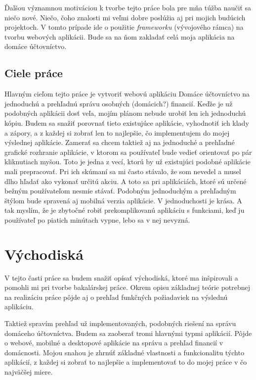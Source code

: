 \documentclass[12pt,oneside]{book}
\begin{document}
Ďalšou významnou motiváciou k tvorbe tejto práce bola pre mňa túžba naučiť sa niečo nové. Niečo, čoho znalosti mi veľmi dobre poslúžia aj pri mojich budúcich projektoch. V tomto prípade ide o použitie \emph{frameworku} (vývojového rámca) na tvorbu webových aplikácii. Bude sa na ňom zakladať celá moja aplikácia na domáce účtovníctvo.   

\section{Ciele práce}
Hlavným cieľom tejto práce je vytvoriť webovú aplikáciu Domáce účtovníctvo na jednoduchú a prehľadnú správu osobných (domácich?) financií. Keďže je už podobných aplikácii dosť veľa, mojím plánom nebude urobiť len ich jednoduchú kópiu. Budem sa snažiť porovnať tieto existujúce aplikácie, vyhodnotiť ich klady a zápory, a z každej si zobrať len to najlepšie, čo implementujem do mojej výslednej aplikácie. Zamerať sa chcem taktiež aj na jednoduché a prehľadné grafické rozhranie aplikácie, v ktorom sa používateľ bude vedieť orientovať po pár kliknutiach myšou. Toto je jedna z vecí, ktorú by už existujúci podobné aplikácie mali prepracovať. Pri ich skúmaní sa mi často stávalo, že som nevedel a musel dlho hľadať ako vykonať určitú akciu. A toto sa pri aplikáciách, ktoré sú určené bežným používateľom nesmie stávať. Podobným jednoduchým a prehľadným štýlom bude spravená aj mobilná verzia aplikácie. V jednoduchosti je krása. A tak myslím, že je zbytočné robiť prekomplikovanú aplikáciu s  funkciami, keď ju používateľ po piatich minútach vypne, lebo sa v nej nevyzná.


\chapter{Východiská}\label{chap:background}
V tejto časti práce sa budem snažiť opísať východiská, ktoré ma inšpirovali a pomohli mi pri tvorbe bakalárskej práce. Okrem opisu základnej teórie potrebnej na realizáciu práce pôjde aj o prehľad funkčných požiadaviek na výslednú aplikáciu.

Taktiež spravím prehľad už implementovaných, podobných riešení na správu domáceho účtovníctva. Budem sa zaoberať tromi hlavnými typmi aplikácií. Pôjde o webové, mobilné a desktopové aplikácie na správu a prehľad financií v domácnosti. Mojou snahou je zhrnúť základné vlastnosti a funkcionalitu týchto aplikácií, z každej si zobrať to najlepšie a implementovať to do mojej práce v čo najväčšej miere.
\end{document}

